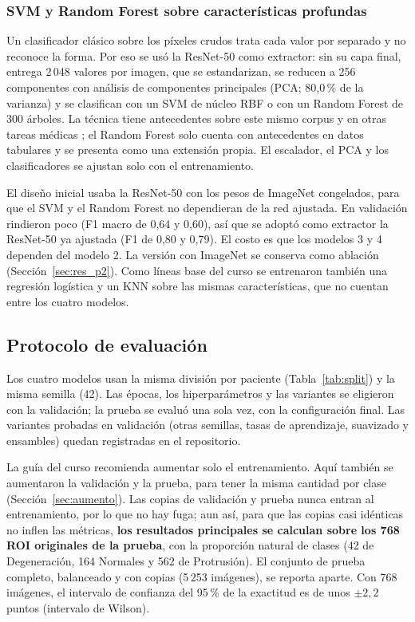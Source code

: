\subsubsection{SVM y Random Forest sobre características profundas}
Un clasificador clásico sobre los píxeles crudos trata cada valor por separado y no reconoce la forma. Por eso se usó la ResNet-50 como extractor: sin su capa final, entrega 2\,048 valores por imagen, que se estandarizan, se reducen a 256 componentes con análisis de componentes principales (PCA; 80,0\,\% de la varianza) y se clasifican con un SVM de núcleo RBF o con un Random Forest de 300 árboles. La técnica tiene antecedentes sobre este mismo corpus \cite{sari2025} y en otras tareas médicas \cite{khoiwal2024}; el Random Forest solo cuenta con antecedentes en datos tabulares \cite{zhang2023} y se presenta como una extensión propia. El escalador, el PCA y los clasificadores se ajustan solo con el entrenamiento.

El diseño inicial usaba la ResNet-50 con los pesos de ImageNet congelados, para que el SVM y el Random Forest no dependieran de la red ajustada. En validación rindieron poco (F1 macro de 0,64 y 0,60), así que se adoptó como extractor la ResNet-50 ya ajustada (F1 de 0,80 y 0,79). El costo es que los modelos 3 y 4 dependen del modelo 2. La versión con ImageNet se conserva como ablación (Sección~\ref{sec:res_p2}). Como líneas base del curso se entrenaron también una regresión logística y un KNN sobre las mismas características, que no cuentan entre los cuatro modelos.

\subsection{Protocolo de evaluación}
\label{sec:protocolo}
Los cuatro modelos usan la misma división por paciente (Tabla~\ref{tab:split}) y la misma semilla (42). Las épocas, los hiperparámetros y las variantes se eligieron con la validación; la prueba se evaluó una sola vez, con la configuración final. Las variantes probadas en validación (otras semillas, tasas de aprendizaje, suavizado y ensambles) quedan registradas en el repositorio.

La guía del curso recomienda aumentar solo el entrenamiento. Aquí también se aumentaron la validación y la prueba, para tener la misma cantidad por clase (Sección~\ref{sec:aumento}). Las copias de validación y prueba nunca entran al entrenamiento, por lo que no hay fuga; aun así, para que las copias casi idénticas no inflen las métricas, \textbf{los resultados principales se calculan sobre los 768 ROI originales de la prueba}, con la proporción natural de clases (42 de Degeneración, 164 Normales y 562 de Protrusión). El conjunto de prueba completo, balanceado y con copias (5\,253 imágenes), se reporta aparte. Con 768 imágenes, el intervalo de confianza del 95\,\% de la exactitud es de unos $\pm 2{,}2$ puntos (intervalo de Wilson).
